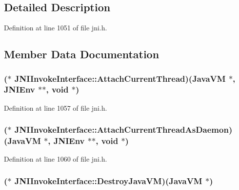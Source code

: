 \subsection{Detailed Description}


Definition at line 1051 of file jni.\-h.



\subsection{Member Data Documentation}
\hypertarget{struct_j_n_i_invoke_interface_abcdc26f5facdb9f6e1550616a8ca1d56}{
\subsubsection[{Attach\-Current\-Thread}]{($\ast$ J\-N\-I\-Invoke\-Interface\-::\-Attach\-Current\-Thread)({\bf Java\-V\-M} $\ast$, {\bf J\-N\-I\-Env} $\ast$$\ast$, void $\ast$)}}\label{struct_j_n_i_invoke_interface_abcdc26f5facdb9f6e1550616a8ca1d56}


Definition at line 1057 of file jni.\-h.

\hypertarget{struct_j_n_i_invoke_interface_a00bb873d81be3814dda5a566a7213ce3}{
\subsubsection[{Attach\-Current\-Thread\-As\-Daemon}]{($\ast$ J\-N\-I\-Invoke\-Interface\-::\-Attach\-Current\-Thread\-As\-Daemon)({\bf Java\-V\-M} $\ast$, {\bf J\-N\-I\-Env} $\ast$$\ast$, void $\ast$)}}\label{struct_j_n_i_invoke_interface_a00bb873d81be3814dda5a566a7213ce3}


Definition at line 1060 of file jni.\-h.

\hypertarget{struct_j_n_i_invoke_interface_aff59d0dcac4f04992b9b3a05c7624120}{
\subsubsection[{Destroy\-Java\-V\-M}]{($\ast$ J\-N\-I\-Invoke\-Interface\-::\-Destroy\-Java\-V\-M)({\bf Java\-V\-M} $\ast$)}}\label{struct_j_n_i_invoke_interface_aff59d0dcac4f04992b9b3a05c7624120}


